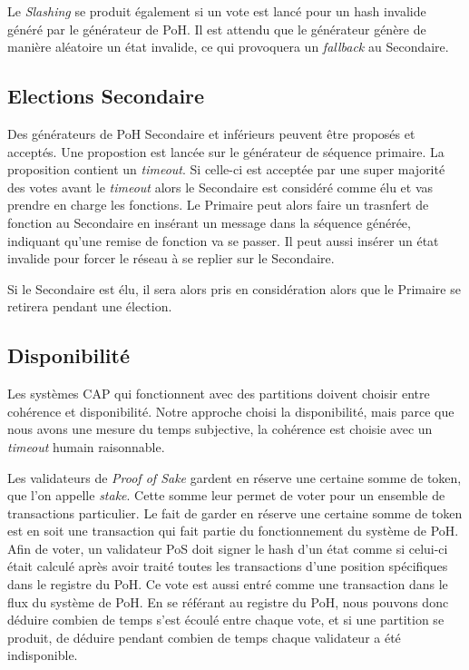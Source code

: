 \documentclass[12pt]{article}
\begin{document}
Le \textit{Slashing} se produit également si un vote est lancé pour un hash invalide généré par le générateur de PoH. Il est attendu que le générateur génère de manière aléatoire un état invalide, ce qui provoquera un \textit{fallback} au Secondaire.

\subsection{Elections Secondaire}
Des générateurs de PoH Secondaire et inférieurs peuvent être proposés et acceptés. Une propostion est lancée sur le générateur de séquence primaire. La proposition contient un \textit{timeout}. Si celle-ci est acceptée par une super majorité des votes avant le \textit{timeout} alors le Secondaire est considéré comme élu et vas prendre en charge les fonctions. Le Primaire peut alors faire un trasnfert de fonction au Secondaire en insérant un message dans la séquence générée, indiquant qu'une remise de fonction va se passer. Il peut aussi insérer un état invalide pour forcer le réseau à se replier sur le Secondaire.

Si le Secondaire est élu, il sera alors pris en considération alors que le Primaire se retirera pendant une élection.

\subsection{Disponibilité}\label{disponibility}
Les systèmes CAP qui fonctionnent avec des partitions doivent choisir entre cohérence et disponibilité. Notre approche choisi la disponibilité, mais parce que nous avons une mesure du temps subjective, la cohérence est choisie avec un \textit{timeout} humain raisonnable.

Les validateurs de \textit{Proof of Sake} gardent en réserve une certaine somme de token, que l'on appelle \textit{stake}. Cette somme leur permet de voter pour un ensemble de transactions particulier. Le fait de garder en réserve une certaine somme de token est en soit une transaction qui fait partie du fonctionnement du système de PoH. Afin de voter, un validateur PoS doit signer le hash d'un état comme si celui-ci était calculé après avoir traité toutes les transactions d'une position spécifiques dans le registre du PoH. Ce vote est aussi entré comme une transaction dans le flux du système de PoH. En se référant au registre du PoH, nous pouvons donc déduire combien de temps s'est écoulé entre chaque vote, et si une partition se produit, de déduire pendant combien de temps chaque validateur a été indisponible.
\end{document}

